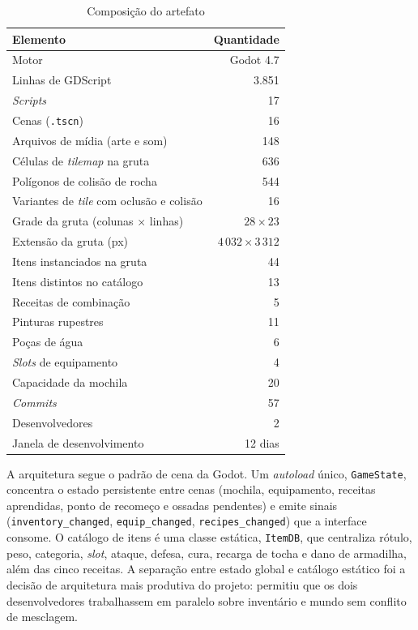 \documentclass[conference]{IEEEtran}
\begin{document}
\begin{table}[t]
\caption{Composição do artefato}
\label{tab:ficha}
\centering
\begin{tabular}{lr}
\toprule
\textbf{Elemento} & \textbf{Quantidade} \\
\midrule
Motor & Godot 4.7 \\
Linhas de GDScript & 3.851 \\
\textit{Scripts} & 17 \\
Cenas (\texttt{.tscn}) & 16 \\
Arquivos de mídia (arte e som) & 148 \\
\midrule
Células de \textit{tilemap} na gruta & 636 \\
Polígonos de colisão de rocha & 544 \\
Variantes de \textit{tile} com oclusão e colisão & 16 \\
Grade da gruta (colunas $\times$ linhas) & $28 \times 23$ \\
Extensão da gruta (px) & $4\,032 \times 3\,312$ \\
\midrule
Itens instanciados na gruta & 44 \\
Itens distintos no catálogo & 13 \\
Receitas de combinação & 5 \\
Pinturas rupestres & 11 \\
Poças de água & 6 \\
\textit{Slots} de equipamento & 4 \\
Capacidade da mochila & 20 \\
\midrule
\textit{Commits} & 57 \\
Desenvolvedores & 2 \\
Janela de desenvolvimento & 12 dias \\
\bottomrule
\end{tabular}
\end{table}

A arquitetura segue o padrão de cena da Godot. Um \textit{autoload} único,
\texttt{GameState}, concentra o estado persistente entre cenas (mochila, equipamento, receitas aprendidas, ponto de recomeço e ossadas pendentes) e emite sinais (\texttt{inventory\_changed}, \texttt{equip\_changed},
\texttt{recipes\_changed}) que a interface consome. O catálogo de itens é uma classe
estática, \texttt{ItemDB}, que centraliza rótulo, peso, categoria, \textit{slot},
ataque, defesa, cura, recarga de tocha e dano de armadilha, além das cinco receitas. A
separação entre estado global e catálogo estático foi a decisão de arquitetura mais
produtiva do projeto: permitiu que os dois desenvolvedores trabalhassem em paralelo
sobre inventário e mundo sem conflito de mesclagem.
\end{document}
